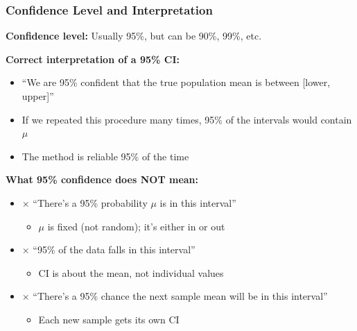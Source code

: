 \documentclass{beamer}
\begin{document}
\begin{frame}
\frametitle{Confidence Level and Interpretation}
\textbf{Confidence level:} Usually 95\%, but can be 90\%, 99\%, etc.

\vspace{0.5cm}
\textbf{Correct interpretation of a 95\% CI:}
\begin{itemize}
\item ``We are 95\% confident that the true population mean is between [lower, upper]''
\item If we repeated this procedure many times, 95\% of the intervals would contain $\mu$
\item The method is reliable 95\% of the time
\end{itemize}

\vspace{0.5cm}
\textbf{What 95\% confidence does NOT mean:}
\begin{itemize}
\item $\times$ ``There's a 95\% probability $\mu$ is in this interval''
  \begin{itemize}
  \item $\mu$ is fixed (not random); it's either in or out
  \end{itemize}
\item $\times$ ``95\% of the data falls in this interval''
  \begin{itemize}
  \item CI is about the mean, not individual values
  \end{itemize}
\item $\times$ ``There's a 95\% chance the next sample mean will be in this interval''
  \begin{itemize}
  \item Each new sample gets its own CI
  \end{itemize}
\end{itemize}
\end{frame}
\end{document}
